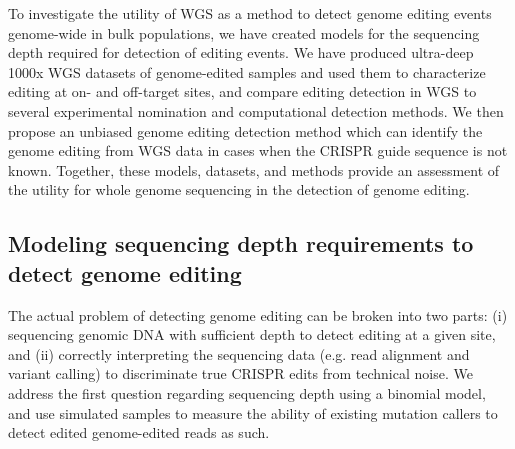 \documentclass[a4paper, titlepage, openright]{book}
\begin{document}
To investigate the utility of WGS as a method to detect genome editing events genome-wide in bulk populations, we have created models for the sequencing depth required for detection of editing events. We have produced ultra-deep 1000x WGS datasets of genome-edited samples and used them to characterize editing at on- and off-target sites, and compare editing detection in WGS to several experimental nomination and computational detection methods. We then propose an unbiased genome editing detection method which can identify the genome editing from WGS data in cases when the CRISPR guide sequence is not known. Together, these models, datasets, and methods provide an assessment of the utility for whole genome sequencing in the detection of genome editing. 
\subsection{Modeling sequencing depth requirements to detect genome editing}
The actual problem of detecting genome editing can be broken into two parts: (i) sequencing genomic DNA with sufficient depth to detect editing at a given site, and (ii) correctly interpreting the sequencing data (e.g. read alignment and variant calling) to discriminate true CRISPR edits from technical noise. We address the first question regarding sequencing depth using a binomial model, and use simulated samples to measure the ability of existing mutation callers to detect edited genome-edited reads as such.
\end{document}
